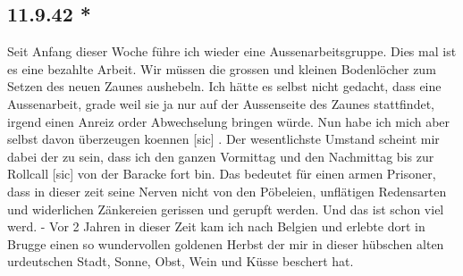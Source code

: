 \subsection{11.9.42 *}

Seit Anfang dieser Woche f\"{u}hre ich wieder eine Aussenarbeitsgruppe.
Dies mal ist es eine bezahlte Arbeit.
Wir m\"{u}ssen die grossen und kleinen Bodenl\"{o}cher zum Setzen des neuen Zaunes aushebeln.
Ich h\"{a}tte es selbst nicht gedacht, dass eine Aussenarbeit, grade weil sie ja nur auf der Aussenseite des Zaunes stattfindet, irgend einen Anreiz order Abwechselung bringen w\"{u}rde.
Nun habe ich mich aber selbst davon \"{u}berzeugen koennen{\color{red} [sic] }.
Der wesentlichste Umstand scheint mir dabei der zu sein, dass ich den ganzen Vormittag und den Nachmittag bis zur Rollcall{\color{red} [sic] } von der Baracke fort bin.
Das bedeutet f\"{u}r einen armen Prisoner, dass in dieser zeit seine Nerven nicht von den P\"{o}beleien, unfl\"{a}tigen Redensarten und widerlichen Z\"{a}nkereien gerissen und gerupft werden.
Und das ist schon viel werd. - Vor 2 Jahren in dieser Zeit kam ich nach Belgien und erlebte dort in Brugge einen so wundervollen goldenen Herbst der mir in dieser h\"{u}bschen alten urdeutschen Stadt, Sonne, Obst, Wein und K\"{u}sse beschert hat.

\clearpage
